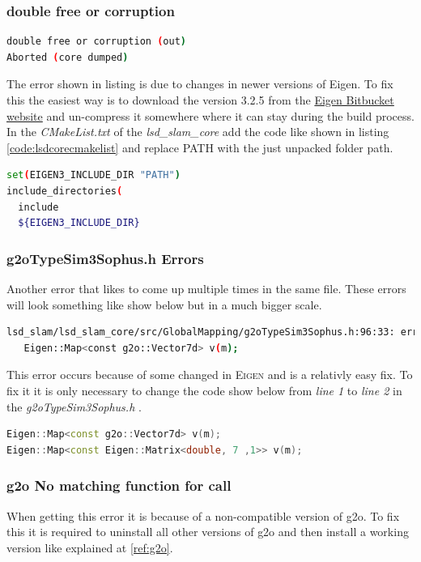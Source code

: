 \subsubsection{double free or corruption}
\begin{lstlisting}[language=bash]
double free or corruption (out)
Aborted (core dumped)
\end{lstlisting}
The error shown in listing is due to changes in newer versions of Eigen. To fix this the easiest way is to download the version \textsc{3.2.5} from the \href{https://bitbucket.org/eigen/eigen/downloads/?tab=tags}{Eigen Bitbucket website} \cite{eigenbitbucket} and un-compress it somewhere where it can stay during the build process.
In the \textit{CMakeList.txt} of the \textit{lsd\_slam\_core} add the code like shown in listing \ref{code:lsdcorecmakelist} and replace \textsc{PATH} with the just unpacked folder path.
\begin{lstlisting}[language=bash, label={code:lsdcorecmakelist}, caption={CMakeList in lsd\_slam\_core with fix for Eigen}]
set(EIGEN3_INCLUDE_DIR "PATH")
include_directories(
  include
  ${EIGEN3_INCLUDE_DIR}
\end{lstlisting}

\subsubsection{g2oTypeSim3Sophus.h Errors}
Another error that likes to come up multiple times in the same file. 
These errors will look something like show below but in a much bigger scale.
\begin{lstlisting}[language=bash]
lsd_slam/lsd_slam_core/src/GlobalMapping/g2oTypeSim3Sophus.h:96:33: error: template argument 1 is invalid
   Eigen::Map<const g2o::Vector7d> v(m);
\end{lstlisting}
This error occurs because of some changed in \textsc{Eigen} and is a relativly easy fix.
To fix it it is only necessary to change the code show below from \textit{line 1} to \textit{line 2} in the \textit{g2oTypeSim3Sophus.h} \cite{g2oTypeSim3Sophus.hfix}.

\begin{lstlisting}[language=C++, caption={Fix for g2oTypeSim3Sophus.h}]
Eigen::Map<const g2o::Vector7d> v(m);
Eigen::Map<const Eigen::Matrix<double, 7 ,1>> v(m);
\end{lstlisting}

\subsubsection{g2o No matching function for call}
When getting this error it is because of a non-compatible version of \gls{g2o}. To fix this it is required to uninstall all other versions of \gls{g2o} and then install a working version like explained at \ref{ref:g2o}.

